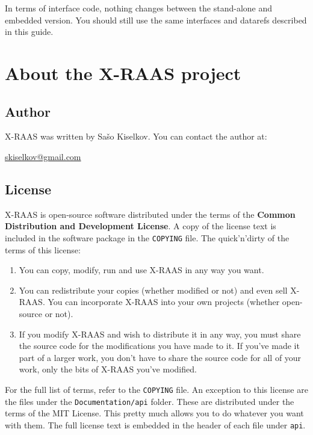 \documentclass[a4paper,12pt]{article}
\begin{document}
\noindent In terms of interface code, nothing changes between the
stand-alone and embedded version. You should still use the same
interfaces and datarefs described in this guide.

\newpage
\section{About the X-RAAS project}

\subsection{Author}

X-RAAS was written by Sašo Kiselkov. You can contact the author at:

\vspace{1em}

\href{mailto:skiselkov@gmail.com}{skiselkov@gmail.com}

\subsection{License}

X-RAAS is open-source software distributed under the terms of the
\textbf{Common Distribution and Development License}. A copy of the
license text is included in the software package in the \texttt{COPYING}
file. The quick'n'dirty of the terms of this license:

\begin{enumerate}

\item You can copy, modify, run and use X-RAAS in any way you want.

\item You can redistribute your copies (whether modified or not) and even
sell X-RAAS. You can incorporate X-RAAS into your own projects (whether
open-source or not).

\item If you modify X-RAAS and wish to distribute it in any way, you must
share the source code for the modifications you have made to it. If
you've made it part of a larger work, you don't have to share the source
code for all of your work, only the bits of X-RAAS you've modified.

\end{enumerate}

\noindent For the full list of terms, refer to the \texttt{COPYING} file.
An exception to this license are the files under the
\texttt{Documentation/api} folder. These are distributed under the terms
of the MIT License. This pretty much allows you to do whatever you want
with them. The full license text is embedded in the header of each file
under \texttt{api}.
\end{document}
